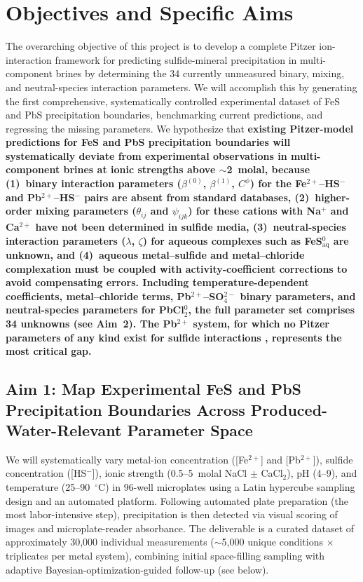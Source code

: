 \documentclass[12pt]{article}
\begin{document}
\section{Objectives and Specific Aims}

The overarching objective of this project is to develop a complete Pitzer ion-interaction framework for predicting sulfide-mineral precipitation in multi-component brines by determining the 34 currently unmeasured binary, mixing, and neutral-species interaction parameters. We will accomplish this by generating the first comprehensive, systematically controlled experimental dataset of FeS and PbS precipitation boundaries, benchmarking current predictions, and regressing the missing parameters. We hypothesize that \textbf{existing Pitzer-model predictions for FeS and PbS precipitation boundaries will systematically deviate from experimental observations in multi-component brines at ionic strengths above $\sim$2~molal, because (1)~binary interaction parameters ($\beta^{(0)}$, $\beta^{(1)}$, $C^\phi$) for the Fe$^{2+}$--HS$^-$ and Pb$^{2+}$--HS$^-$ pairs are absent from standard databases, (2)~higher-order mixing parameters ($\theta_{ij}$ and $\psi_{ijk}$) for these cations with Na$^+$ and Ca$^{2+}$ have not been determined in sulfide media, (3)~neutral-species interaction parameters ($\lambda$, $\zeta$) for aqueous complexes such as FeS$^0_{\text{aq}}$ are unknown, and (4)~aqueous metal--sulfide and metal--chloride complexation must be coupled with activity-coefficient corrections to avoid compensating errors. Including temperature-dependent coefficients, metal--chloride terms, Pb$^{2+}$--SO$_4^{2-}$ binary parameters, and neutral-species parameters for PbCl$_2^0$, the full parameter set comprises 34 unknowns (see Aim~2). The Pb$^{2+}$ system, for which no Pitzer parameters of any kind exist for sulfide interactions \cite{wang2020,felmy2000}, represents the most critical gap.}

\subsection{Aim 1: Map Experimental FeS and PbS Precipitation Boundaries Across Produced-Water-Relevant Parameter Space}

We will systematically vary metal-ion concentration ([Fe$^{2+}$] and [Pb$^{2+}$]), sulfide concentration ([HS$^-$]), ionic strength (0.5--5~molal NaCl $\pm$ CaCl$_2$), pH (4--9), and temperature (25--90~$^\circ$C) in 96-well microplates using a Latin hypercube sampling design and an automated platform. Following automated plate preparation (the most labor-intensive step), precipitation is then detected via visual scoring of images and microplate-reader absorbance. The deliverable is a curated dataset of approximately 30,000 individual measurements ($\sim$5,000 unique conditions $\times$ triplicates per metal system), combining initial space-filling sampling with adaptive Bayesian-optimization-guided follow-up (see below).
\end{document}
